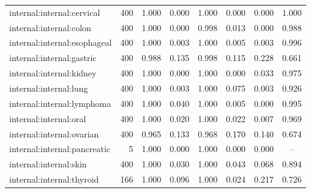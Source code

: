 \begin{tabular}{@{}lrcccccc@{}}
internal:internal:cervical & 400 & 1.000 & 0.000 & 1.000 & 0.000 & 0.000 & 1.000 \\
internal:internal:colon & 400 & 1.000 & 0.000 & 0.998 & 0.013 & 0.000 & 0.988 \\
internal:internal:esophageal & 400 & 1.000 & 0.003 & 1.000 & 0.005 & 0.003 & 0.996 \\
internal:internal:gastric & 400 & 0.988 & 0.135 & 0.998 & 0.115 & 0.228 & 0.661 \\
internal:internal:kidney & 400 & 1.000 & 0.000 & 1.000 & 0.000 & 0.033 & 0.975 \\
internal:internal:lung & 400 & 1.000 & 0.003 & 1.000 & 0.075 & 0.003 & 0.926 \\
internal:internal:lymphoma & 400 & 1.000 & 0.040 & 1.000 & 0.005 & 0.000 & 0.995 \\
internal:internal:oral & 400 & 1.000 & 0.020 & 1.000 & 0.022 & 0.007 & 0.969 \\
internal:internal:ovarian & 400 & 0.965 & 0.133 & 0.968 & 0.170 & 0.140 & 0.674 \\
internal:internal:pancreatic & 5 & 1.000 & 0.000 & 1.000 & 0.000 & 0.000 & -- \\
internal:internal:skin & 400 & 1.000 & 0.030 & 1.000 & 0.043 & 0.068 & 0.894 \\
internal:internal:thyroid & 166 & 1.000 & 0.096 & 1.000 & 0.024 & 0.217 & 0.726 \\
\bottomrule
\end{tabular}